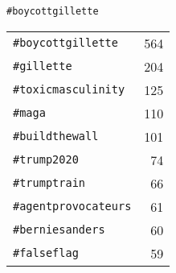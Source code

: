 \centering
\captionsetup{justification=centering,singlelinecheck=off}
\caption{
  \texttt{\#boycottgillette}
}
\begin{tabular}{lr}

\texttt{\#boycottgillette}   & 564 \\
\texttt{\#gillette}          & 204 \\
\texttt{\#toxicmasculinity}  & 125 \\
\texttt{\#maga}              & 110 \\
\texttt{\#buildthewall}      & 101 \\
\texttt{\#trump2020}         & 74 \\
\texttt{\#trumptrain}        & 66 \\
\texttt{\#agentprovocateurs} & 61 \\
\texttt{\#berniesanders}     & 60 \\
\texttt{\#falseflag}         & 59

\end{tabular}

